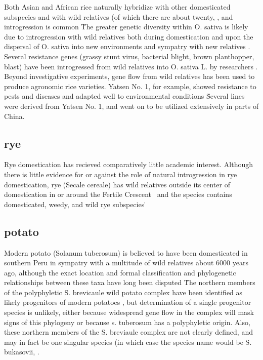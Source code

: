 \documentclass[11pt]{article}
\begin{document}
Both Asian and African rice naturally hybridize with other domesticated subspecies and with wild relatives (of which there are about twenty, \cite{ricepedia}\), and introgression is common \cite{oka2012origin, second1982origin, zhao2010genomic}\.
The greater genetic diversity within O. sativa is likely due to introgression with wild relatives both during domestication and upon the dispersal of O. sativa into new environments and sympatry with new relatives \cite{second1982origin}.
Several resistance genes (grassy stunt virus, bacterial blight, brown planthopper, blast) have been introgressed from wild relatives into O. sativa L. by researchers \cite{brar1997alien, khush1974inheritance}.
Beyond investigative experiments, gene flow from wild relatives has been used to produce agronomic rice varieties.
Yatsen No. 1, for example, showed resistance to pests and diseases and adapted well to environmental conditions \cite{ting1933wild}\.
Several lines were derived from Yatsen No. 1, and went on to be utilized extensively in parts of China.

\subsection*{rye}

Rye domestication has recieved comparatively little academic interest.
Although there is little evidence for or against the role of natural introgression in rye domestication, rye (Secale cereale) has wild relatives outside its center of domestication in or around the Fertile Crescent \cite{vavilov1928geographical}\, and the species contains domesticated, weedy, and wild rye subspecies \cite{khush1961cytogenetic}\.

\subsection*{potato}

Modern potato (Solanum tuberosum) is believed to have been domesticated in southern Peru in sympatry with a multitude of wild relatives about 6000 years ago, although the exact location and formal classification and phylogenetic relationships between these taxa have long been disputed \cite{huaman2002reclassification, spooner2005single, pickersgill1977origins, hawkes1988evolution}\.
The northern members of the polyphyletic S. brevicaule wild potato complex have been identified as likely progenitors of modern potatoes \cite{correll1962potato}, but determination of a single progenitor species is unlikely, either because widespread gene flow in the complex will mask signs of this phylogeny or because s. tuberosum has a polyphyletic origin.
Also, these northern members of the S. breviaule complex are not clearly defined, and may in fact be one singular species (in which case the species name would be S. bukasovii, \cite{spooner2005single}\).
\end{document}

